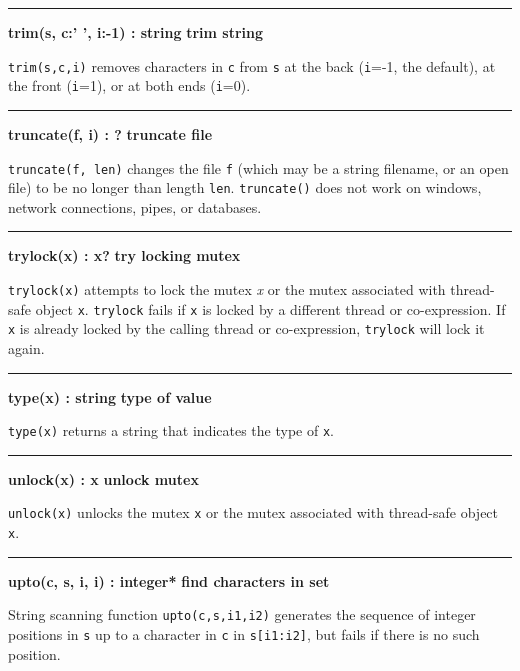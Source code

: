 \bigskip\hrule\vspace{0.1cm}
\noindent
{\bf trim(s, c:' ', i:{}-1) : string } \hfill {\bf trim string}

\noindent
{}\texttt{trim(s,c,i)} removes characters in \texttt{c}
from \texttt{s} at the back (\texttt{i}=-1, the default), at the front
(\texttt{i}=1), or at both ends (\texttt{i}=0).

\bigskip\hrule\vspace{0.1cm}
\noindent
{\bf truncate(f, i) : ? } \hfill {\bf truncate file}

\noindent
{}\texttt{truncate(f, len)} changes the file
\texttt{f} (which may be a string filename, or an open file) to be no
longer than length \texttt{len}. \texttt{truncate()} does not work on
windows, network connections, pipes, or databases.

\bigskip\hrule\vspace{0.1cm}
\noindent
{\bf trylock(x) : x? } \hfill {\bf try locking mutex}

\noindent
{}\texttt{trylock(x)} attempts to lock the mutex {\textit x} or the
mutex associated with thread-safe object \texttt{x}. \texttt{trylock} fails
if \texttt{x} is locked by a different thread or co-expression. If \texttt{x}
is already locked by the calling thread or co-expression, \texttt{trylock}
will lock it again.

\bigskip\hrule\vspace{0.1cm}
\noindent
{\bf type(x) : string } \hfill {\bf type of value}

\noindent
{}\texttt{type(x)} returns a string that indicates the type
of \texttt{x}.

\bigskip\hrule\vspace{0.1cm}
\noindent
{\bf unlock(x) : x } \hfill {\bf unlock mutex}

\noindent
{}\texttt{unlock(x)} unlocks the mutex \texttt{x} or the mutex
associated with thread-safe object \texttt{x}.

\bigskip\hrule\vspace{0.1cm}
\noindent
{\bf upto(c, s, i, i) : integer* } \hfill {\bf find characters in set}

\noindent
String scanning function \texttt{upto(c,s,i1,i2)}
generates the sequence of integer positions in \texttt{s} up to a
character in \texttt{c} in \texttt{s[i1:i2]}, but fails if there is no
such position.

